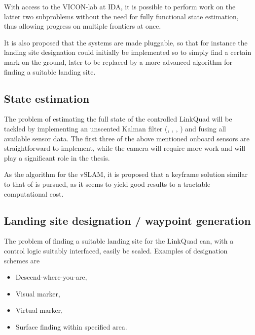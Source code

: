         With access to the VICON-lab at IDA, it is possible to perform
        work on the latter two subproblems without the need for fully
        functional state estimation, thus allowing progress on multiple
        frontiers at once.

        It is also proposed that the systems are made pluggable, so that
        for instance the landing site designation could initially be
        implemented so to simply find a certain mark on the ground, later
        to be replaced by a more advanced algorithm for finding a suitable
        landing site.

    \subsection{State estimation}
        The problem of estimating the full state of the controlled LinkQuad
        will be tackled by implementing an unscented Kalman filter 
        (\cite{Julier95anewapproach}, \cite{Julier97anew}, \cite{vandermerwe:upf}, \cite{Merwe04sigma-pointkalman}) 
        and fusing all available sensor data.
        The first three of the above mentioned onboard sensors are
        straightforward to implement, while the camera will require more
        work and will play a significant role in the thesis.
        
        As the algorithm for the vSLAM, it is proposed that a keyframe solution
        similar to that of \cite{weiss11monocular} is pursued, as it seems to yield
        good results to a tractable computational cost.

    \subsection{Landing site designation / waypoint generation}
        \label{ssec:waypointgeneration}
        The problem of finding a suitable landing site for the LinkQuad
        can, with a control logic suitably interfaced, easily be scaled.
        Examples of designation schemes are
        \begin{itemize}
            \item Descend-where-you-are,
            \item Visual marker,
            \item Virtual marker,
            \item Surface finding within specified area.
        \end{itemize}


